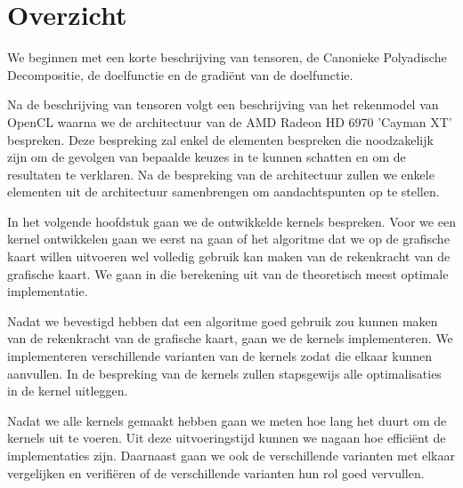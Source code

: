 \section{Overzicht}
We beginnen met een korte beschrijving van tensoren, de Canonieke Polyadische Decompositie, de doelfunctie en de gradi\"ent van de doelfunctie.

Na de beschrijving van tensoren volgt een beschrijving van het rekenmodel van OpenCL waarna we de architectuur van de AMD Radeon HD 6970 'Cayman XT' bespreken. Deze bespreking zal enkel de elementen bespreken die noodzakelijk zijn om de gevolgen van bepaalde keuzes in te kunnen schatten en om de resultaten te verklaren. Na de bespreking van de architectuur zullen we enkele elementen uit de architectuur samenbrengen om aandachtspunten op te stellen.

In het volgende hoofdstuk gaan we de ontwikkelde kernels bespreken. Voor we een kernel ontwikkelen gaan we eerst na gaan of het algoritme dat we op de grafische kaart willen uitvoeren wel volledig gebruik kan maken van de rekenkracht van de grafische kaart. We gaan in die berekening uit van de theoretisch meest optimale implementatie.

Nadat we bevestigd hebben dat een algoritme goed gebruik zou kunnen maken van de rekenkracht van de grafische kaart, gaan we de kernels implementeren. We implementeren verschillende varianten van de kernels zodat die elkaar kunnen aanvullen. In de bespreking van de kernels zullen stapsgewijs alle optimalisaties in de kernel uitleggen.

Nadat we alle kernels gemaakt hebben gaan we meten hoe lang het duurt om de kernels uit te voeren. Uit deze uitvoeringstijd kunnen we nagaan hoe effici\"ent de implementaties zijn. Daarnaast gaan we ook de verschillende varianten met elkaar vergelijken en verifi\"eren of de verschillende varianten hun rol goed vervullen.